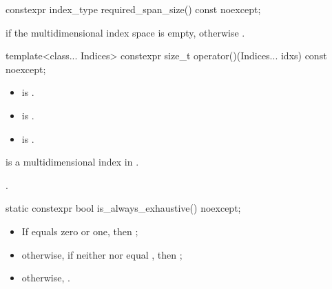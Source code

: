 %
\begin{itemdecl}
constexpr index_type required_span_size() const noexcept;
\end{itemdecl}

\begin{itemdescr}
\pnum
\returns
{} if the multidimensional index space  is empty,
otherwise .
\end{itemdescr}

%
\begin{itemdecl}
template<class... Indices>
constexpr size_t operator()(Indices... idxs) const noexcept;
\end{itemdecl}

\begin{itemdescr}
\pnum
\constraints
\begin{itemize}
\item
{} is .
\item
{} is .
\item
{} is .
\end{itemize}

\pnum
\expects
{} is
a multidimensional index in .

\pnum
\returns
{}.
\end{itemdescr}

%
\begin{itemdecl}
static constexpr bool is_always_exhaustive() noexcept;
\end{itemdecl}

\begin{itemdescr}
\pnum
\returns
\begin{itemize}
\item
If  equals zero or one, then ;
\item
otherwise,
if neither  nor 
equal ,
then ;
\item
otherwise, .
\end{itemize}
\end{itemdescr}

